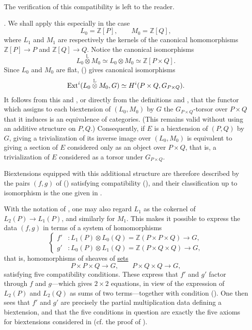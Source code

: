 The verification of this compatibility is left to the reader.

. We shall apply this especially in the case
\[
 L_0=\mathbb Z[P],\qquad M_0=\mathbb Z[Q],
\]
where $L_1$ and $M_1$ are respectively the kernels of the canonical
homomorphisms $\mathbb Z[P]\longrightarrow P$ and
$\mathbb Z[Q]\longrightarrow Q$.  Notice the canonical isomorphisms
\[
 L_0\mathbin{\overset{\mathbb L}{\otimes}}M_0
 \simeq L_0\otimes M_0
 \simeq\mathbb Z[P\times Q].
\]
Since $L_0$ and $M_0$ are flat, () gives canonical isomorphisms
\[
 \operatorname{Ext}^i(L_0\mathbin{\overset{\mathbb L}{\otimes}}M_0,G)
 \simeq H^i(P\times Q,G_{P\times Q}).
\]
It follows from this and , or directly from the definitions and
, that the functor which assigns to each biextension of
$(L_0,M_0)$ by $G$ the $G_{P\times Q}$-torsor over $P\times Q$ that
it induces is an equivalence of categories.  (This remains valid
without using an additive structure on $P,Q$.)  Consequently, if
$E$ is a biextension of $(P,Q)$ by $G$, giving a trivialization of
its inverse image over $(L_0,M_0)$ is equivalent to giving a section
of $E$ considered only as an object over $P\times Q$, that is, a
trivialization of $E$ considered as a torsor under $G_{P\times Q}$.

Biextensions equipped with this additional structure are therefore
described by the pairs $(f,g)$ of () satisfying compatibility
(), and their classification up to isomorphism is the one given
in .

With the notation of , one may also regard $L_1$ as the cokernel
of $L_2(P)\longrightarrow L_1(P)$, and similarly for $M_1$.  This
makes it possible to express the data $(f,g)$ in terms of a system
of homomorphisms
\[
\left\{
\begin{aligned}
 f'&:L_1(P)\otimes L_0(Q)
     =\mathbb Z(P\times P\times Q)\longrightarrow G,\\
 g'&:L_0(P)\otimes L_1(Q)
     =\mathbb Z(P\times Q\times Q)\longrightarrow G,
\end{aligned}
\right.
\]
that is, homomorphisms of sheaves of \underline{sets}
\[
 P\times P\times Q\longrightarrow G,\qquad
 P\times Q\times Q\longrightarrow G,
\]
satisfying five compatibility conditions.  These express that $f'$
and $g'$ factor through $f$ and $g$---which gives $2\times2$
equations, in view of the expression of $L_2(P)$ and $L_2(Q)$ as
sums of two terms---together with condition ().  One then sees
that $f'$ and $g'$ are precisely the partial multiplication data
defining a biextension, and that the five conditions in question are
exactly the five axioms for biextensions considered in  (cf. the
proof of ).

